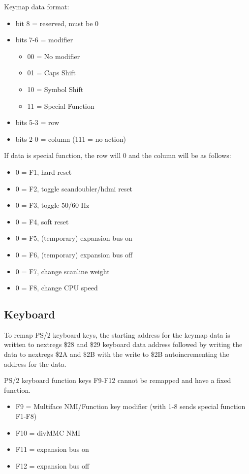 Keymap data format:
\begin{itemize}
\item bit 8 = reserved, must be 0
\item bits 7-6 = modifier
  \begin{itemize}
  \item[] 00 = No modifier
  \item[] 01 = Caps Shift
  \item[] 10 = Symbol Shift
  \item[] 11 = Special Function
  \end{itemize}
\item bits 5-3 = row
\item bits 2-0 = column (111 = no action)
\end{itemize}

If data is special function, the row will 0 and the column will be as follows:
\begin{itemize}
\item 0 = F1, hard reset
\item 0 = F2, toggle scandoubler/hdmi reset
\item 0 = F3, toggle 50/60 Hz
\item 0 = F4, soft reset
\item 0 = F5, (temporary) expansion bus on
\item 0 = F6, (temporary) expansion bus off
\item 0 = F7, change scanline weight
\item 0 = F8, change CPU speed
\end{itemize}  






\subsection{Keyboard}

To remap PS/2 keyboard keys, the starting address for the keymap data
is written to nextregs \$28 and \$29 keyboard data address followed by
writing the data to nextregs \$2A and \$2B with the write to \$2B
autoincrementing the address for the data.

PS/2 keyboard function keys F9-F12 cannot be remapped and have a fixed function.
\begin{itemize}
\item F9 = Multiface NMI/Function key modifier (with 1-8 sends special
  function F1-F8)
\item F10 = divMMC NMI
\item F11 = expansion bus on
\item F12 = expansion bus off
\end{itemize}

